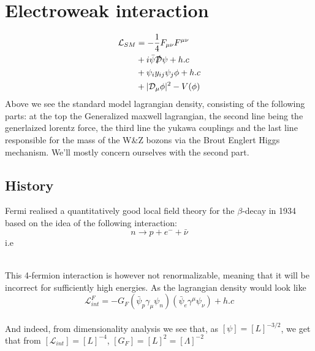 \documentclass[11pt,a4paper,faculty=we,language=en,doctype=report]{cls/ugent-doc}
\begin{document}
\section{Electroweak interaction}
\begin{align*}
  \mathcal{L}_{SM} &= -\frac{1}{4}F_{\mu\nu}F^{\mu\nu}\\
                   & + i\bar{\psi}\slashed{\mathcal{D}}\psi + h.c\\
                   & + \psi_iy_{ij}\psi_j\phi + h.c\\
                   &+|\mathcal{D}_\mu\phi|^2 - V(\phi)
\end{align*}
Above we see the standard model lagrangian density, consisting of the following parts: at the top the Generalized maxwell lagrangian,
the second line being the generlaized lorentz force, the third line the yukawa couplings and the last line responsible for
the mass of the W\&Z bozons via the Brout Englert Higgs mechanism. We'll mostly concern ourselves with 
the second part.
\subsection{History}
Fermi realised a quantitatively good local field theory for the $\beta$-decay in 1934 based on the idea of the following
interaction:
\begin{equation}
	n \rightarrow p + e^- + \bar{\nu} \label{eqn:neutron decay}
\end{equation}
i.e
\begin{figure}[h!]
	\centering
\end{figure}\\
This 4-fermion interaction is however not renormalizable, meaning that it will be incorrect for sufficiently high
energies. As the lagrangian density would look like
\begin{equation}
	\mathcal{L}^F_{int} = -G_F (\bar{\psi}_p\gamma_\mu \psi_n) (\bar{\psi}_e\gamma^\mu\psi_\nu) + h.c
\end{equation}\\
And indeed, from dimensionality analysis we see that, as $[\psi]=[L]^{-3/2}$, we get that from $[\mathcal{L}_{int}] = [L]^{-4}$, $[G_F] = [L]^2 = [\Lambda]^{-2}$
\end{document}

